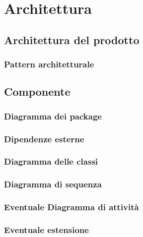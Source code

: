 \section{Architettura}

\subsection{Architettura del prodotto}
\subsubsection{Pattern architetturale}

\subsection{Componente}
\subsubsection{Diagramma dei package}
\subsubsection{Dipendenze esterne}
\subsubsection{Diagramma delle classi}
\subsubsection{Diagramma di sequenza}
\subsubsection{Eventuale Diagramma di attività}
\subsubsection{Eventuale estensione}
